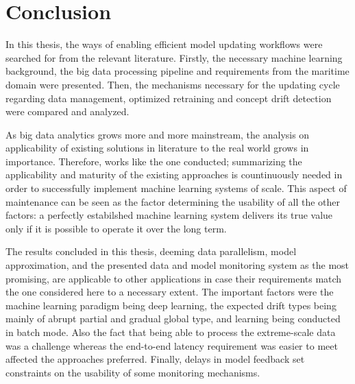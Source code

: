 \chapter{Conclusion}

In this thesis, the ways of enabling efficient model updating workflows were searched for from the relevant literature. Firstly, the necessary machine learning background, the big data processing pipeline and requirements from the maritime domain were presented. Then, the mechanisms necessary for the updating cycle regarding data management, optimized retraining and concept drift detection were compared and analyzed.

As big data analytics grows more and more mainstream, the analysis on applicability of existing solutions in literature to the real world grows in importance. Therefore, works like the one conducted; summarizing the applicability and maturity of the existing approaches is countinuously needed in order to successfully implement machine learning systems of scale. This aspect of maintenance can be seen as the factor determining the usability of all the other factors: a perfectly estabilshed machine learning system delivers its true value only if it is possible to operate it over the long term.

The results concluded in this thesis, deeming data parallelism, model approximation, and the presented data and model monitoring system as the most promising, are applicable to other applications in case their requirements match the one considered here to a necessary extent. The important factors were the machine learning paradigm being deep learning, the expected drift types being mainly of abrupt partial and gradual global type, and learning being conducted in batch mode. Also the fact that being able to process the extreme-scale data was a challenge whereas the end-to-end latency requirement was easier to meet affected the approaches preferred. Finally, delays in model feedback set constraints on the usability of some monitoring mechanisms.



 
